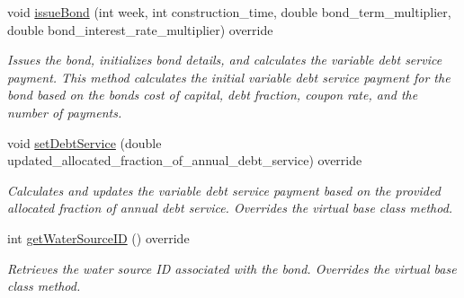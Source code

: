 \begin{DoxyCompactItemize}
void \mbox{\hyperlink{classVariableDebtServiceBond_a7d91921482f01d9bb37dba6e6d085771}{issue\+Bond}} (int week, int construction\+\_\+time, double bond\+\_\+term\+\_\+multiplier, double bond\+\_\+interest\+\_\+rate\+\_\+multiplier) override
\begin{DoxyCompactList}\small\item\em Issues the bond, initializes bond details, and calculates the variable debt service payment. This method calculates the initial variable debt service payment for the bond based on the bond\textquotesingle{}s cost of capital, debt fraction, coupon rate, and the number of payments. \end{DoxyCompactList}\item 
void \mbox{\hyperlink{classVariableDebtServiceBond_a692563150053b280f6e1ef23fd47c117}{set\+Debt\+Service}} (double updated\+\_\+allocated\+\_\+fraction\+\_\+of\+\_\+annual\+\_\+debt\+\_\+service) override
\begin{DoxyCompactList}\small\item\em Calculates and updates the variable debt service payment based on the provided allocated fraction of annual debt service. Overrides the virtual base class method. \end{DoxyCompactList}\item 
int \mbox{\hyperlink{classVariableDebtServiceBond_a3edee29f26e8ac74f9767770c6a951c9}{get\+Water\+Source\+ID}} () override
\begin{DoxyCompactList}\small\item\em Retrieves the water source ID associated with the bond. Overrides the virtual base class method. \end{DoxyCompactList}\end{DoxyCompactItemize}

